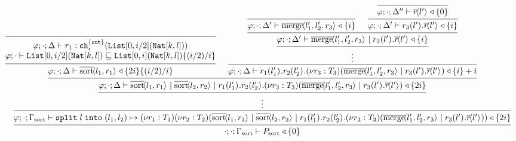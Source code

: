 {\tiny
\begin{align*}
&\kern-3em\begin{prooftree}
    \Infer0{ \begin{matrix}
\varphi;\cdot;\Delta\vdash r_1 : \texttt{ch}^{\{\texttt{out}\}}_{i}(\texttt{List}[0,i/2](\texttt{Nat}[k,l]))\\
%
 \varphi;\cdot\vdash \texttt{List}[0,i/2](\texttt{Nat}[k,l]) \sqsubseteq \texttt{List}[0,i](\texttt{Nat}[k,l])\{(i/2)/i\}
\end{matrix} }
    \Infer1{\varphi;\cdot;\Delta\vdash \asyncoutputch{\text{sort}}{l_1,r_1}{} \triangleleft \{2i\}\{(i/2)/i\}}
    \Infer0{\varphi;\cdot;\Delta'\vdash \asyncoutputch{\text{merge}}{l_1',l_2',r_3}{} \triangleleft \{i\}}
    \Infer0{ \varphi;\cdot;\Delta''\vdash {\asyncoutputch{r}{l'}{}} \triangleleft \{0\} }
    \Infer1{\varphi;\cdot;\Delta'\vdash \inputch{r_3}{l'}{}{\asyncoutputch{r}{l'}{}} \triangleleft \{i\} }
    \Infer2{\varphi;\cdot;\Delta'\vdash \asyncoutputch{\text{merge}}{l_1',l_2',r_3}{} \mid \inputch{r_3}{l'}{}{\asyncoutputch{r}{l'}{}} \triangleleft \{i\} }
    \Infer1{\vdots}
    \Infer1{\varphi;\cdot;\Delta\vdash \inputch{r_1}{l_1'}{}{
\inputch{r_2}{l_2'}{}{\newvar{r_3 : T_3}{(\asyncoutputch{\text{merge}}{l_1',l_2',r_3}{} \mid \inputch{r_3}{l'}{}{\asyncoutputch{r}{l'}{}})}}} \triangleleft \{i\} + i }
    \Infer2{\varphi;\cdot;\Delta\vdash \asyncoutputch{\text{sort}}{l_1,r_1}{} \mid \asyncoutputch{\text{sort}}{l_2,r_2}{} \mid \inputch{r_1}{l_1'}{}{
\inputch{r_2}{l_2'}{}{\newvar{r_3 : T_3}{(\asyncoutputch{\text{merge}}{l_1',l_2',r_3}{} \mid \inputch{r_3}{l'}{}{\asyncoutputch{r}{l'}{}})}}} \triangleleft \{2i\} }
    \Infer1{\vdots}
    \Infer1{\varphi;\cdot;\Gamma_{\text{sort}}\vdash\texttt{split}\; l\; \texttt{into}\; (l_1,l_2) \mapsto \newvar{r_1 : T_1}{\newvar{r_2 : T_2}{
    (\asyncoutputch{\text{sort}}{l_1,r_1}{} \mid \asyncoutputch{\text{sort}}{l_2,r_2}{} \mid \inputch{r_1}{l_1'}{}{\inputch{r_2}{l_2'}{}{\newvar{r_3 : T_3}{(\asyncoutputch{\text{merge}}{l_1',l_2',r_3}{} \mid \inputch{r_3}{l'}{}{\asyncoutputch{r}{l'}{}})}}} )
    }} \triangleleft \{2i\}}
    \Infer1{\cdot;\cdot;\Gamma_{\text{sort}}\vdash P_{\text{sort}} \triangleleft \{0\}}
\end{prooftree}
\end{align*}}


